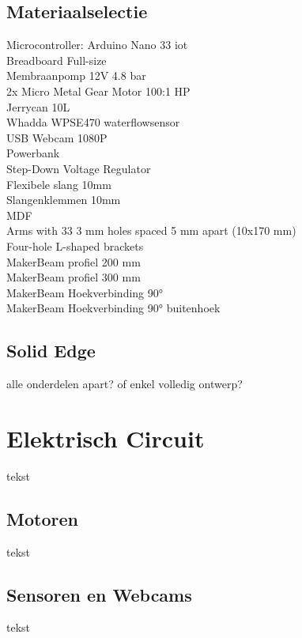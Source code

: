 \documentclass[kulak]{kulakarticle} %
\begin{document}
	\subsection{Materiaalselectie}
	Microcontroller: Arduino Nano 33 iot \\
	Breadboard Full-size \\
	Membraanpomp 12V 4.8 bar \\
	2x Micro Metal Gear Motor 100:1 HP \\
	Jerrycan 10L\\
	Whadda WPSE470 waterflowsensor \\
	USB Webcam 1080P \\
	Powerbank\\
	Step-Down Voltage Regulator \\
	Flexibele slang 10mm \\
	Slangenklemmen 10mm \\
	MDF \\
	Arms with 33 3 mm holes spaced 5 mm apart (10x170 mm) \\
	Four-hole L-shaped brackets \\
	MakerBeam profiel 200 mm \\
	MakerBeam profiel 300 mm \\
	MakerBeam Hoekverbinding 90° \\
	MakerBeam Hoekverbinding 90° buitenhoek \\
	
	
	\subsection{Solid Edge}
	alle onderdelen apart? of enkel volledig ontwerp?
	
	
	\section{Elektrisch Circuit}
	
	tekst
	
	
	\subsection{Motoren}
	
	tekst
	
	
	\subsection{Sensoren en Webcams}
	
	tekst
	
\end{document}
